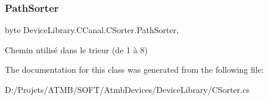 \subsubsection{\texorpdfstring{Path\+Sorter}{PathSorter}}
{\footnotesize\ttfamily byte Device\+Library.\+C\+Canal.\+C\+Sorter.\+Path\+Sorter\hspace{0.3cm}{\ttfamily [get]}, {\ttfamily [set]}}



Chemin utilisé dans le trieur (de 1 à 8) 



The documentation for this class was generated from the following file\+:\begin{DoxyCompactItemize}
\item 
D\+:/\+Projets/\+A\+T\+M\+B/\+S\+O\+F\+T/\+Atmb\+Devices/\+Device\+Library/C\+Sorter.\+cs\end{DoxyCompactItemize}
